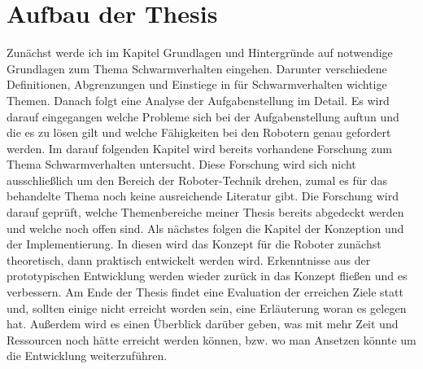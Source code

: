 \section{Aufbau der Thesis}\label{sec:AufbauDerThesis}
Zunächst werde ich im Kapitel Grundlagen und Hintergründe auf notwendige Grundlagen zum Thema Schwarmverhalten eingehen. Darunter verschiedene Definitionen, Abgrenzungen und Einstiege in für Schwarmverhalten wichtige Themen.
Danach folgt eine Analyse der Aufgabenstellung im Detail. Es wird darauf eingegangen welche Probleme sich bei der Aufgabenstellung auftun und die es zu lösen gilt und welche Fähigkeiten bei den Robotern genau gefordert werden.
Im darauf folgenden Kapitel wird bereits vorhandene Forschung zum Thema Schwarmverhalten untersucht. Diese Forschung wird sich nicht ausschließlich um den Bereich der Roboter-Technik drehen, zumal es für das behandelte Thema noch keine ausreichende Literatur gibt. Die Forschung wird darauf geprüft, welche Themenbereiche meiner Thesis bereits abgedeckt werden und welche noch offen sind.
Als nächstes folgen die Kapitel der Konzeption und der Implementierung. In diesen wird das Konzept für die Roboter zunächst theoretisch, dann praktisch entwickelt werden wird. Erkenntnisse aus der prototypischen Entwicklung werden wieder zurück in das Konzept fließen und es verbessern.
Am Ende der Thesis findet eine Evaluation der erreichen Ziele statt und, sollten einige nicht erreicht worden sein, eine Erläuterung woran es gelegen hat. Außerdem wird es einen Überblick darüber geben, was mit mehr Zeit und Ressourcen noch hätte erreicht werden können, bzw. wo man Ansetzen könnte um die Entwicklung weiterzuführen.